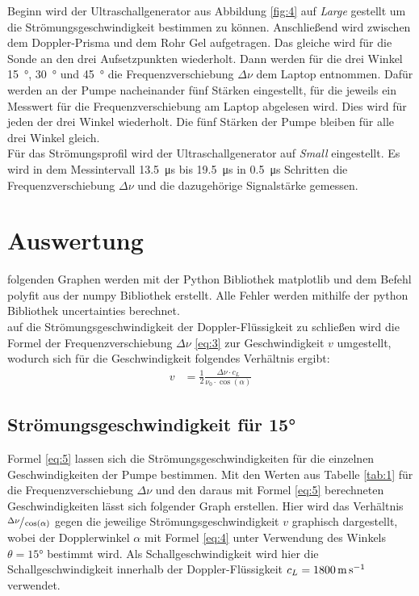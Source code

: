     \justifying Beginn wird der Ultraschallgenerator aus Abbildung \ref{fig:4} auf \textit{Large} gestellt um die Strömungsgeschwindigkeit bestimmen zu können. Anschließend wird zwischen
    dem Doppler-Prisma und dem Rohr Gel aufgetragen. Das gleiche wird für die Sonde an den drei Aufsetzpunkten wiederholt. Dann werden für die drei Winkel \SI{15}{\degree}, 
    \SI{30}{\degree} und \SI{45}{\degree} die Frequenzverschiebung $\Delta\nu$ dem Laptop entnommen. Dafür werden an der Pumpe nacheinander fünf Stärken eingestellt, für die jeweils ein Messwert 
    für die Frequenzverschiebung am Laptop abgelesen wird. Dies wird für jeden der drei Winkel wiederholt. Die fünf Stärken der Pumpe bleiben für alle drei Winkel gleich.\\
    Für das Strömungsprofil wird der Ultraschallgenerator auf \textit{Small} eingestellt. Es wird in dem Messintervall \SI{13.5}{\micro\second} bis \SI{19.5}{\micro\second} in \SI{0.5}{\micro\second} Schritten die 
    Frequenzverschiebung $\Delta\nu$ und die dazugehörige Signalstärke gemessen. 

\newpage
\section{Auswertung}

    \justifying folgenden Graphen werden mit der Python Bibliothek matplotlib \cite{matplotlib} und dem Befehl polyfit aus der numpy Bibliothek \cite{numpy} erstellt. 
    Alle Fehler werden mithilfe der python Bibliothek uncertainties \cite{uncertainties} berechnet.\\
    \justifying auf die Strömungsgeschwindigkeit der Doppler-Flüssigkeit zu schließen wird die Formel der Frequenzverschiebung $\Delta\nu$ \eqref{eq:3} zur Geschwindigkeit
    $v$ umgestellt, wodurch sich für die Geschwindigkeit folgendes Verhältnis ergibt:
    \begin{align}
        v &= \frac{1}{2} \frac{\Delta\nu \cdot c_L}{\nu_0\cdot \cos(\alpha)} \label{eq:5}
    \end{align}

\subsection{Strömungsgeschwindigkeit für 15°}

    \justifying Formel \eqref{eq:5} lassen sich die Strömungsgeschwindigkeiten für die einzelnen Geschwindigkeiten der Pumpe bestimmen. Mit den Werten aus 
    Tabelle \ref{tab:1} für die Frequenzverschiebung $\Delta\nu$ und den daraus mit Formel \eqref{eq:5} berechneten Geschwindigkeiten lässt sich folgender Graph erstellen. Hier
    wird das Verhältnis $\sfrac{\Delta\nu}{\cos(\alpha)}$ gegen die jeweilige Strömungsgeschwindigkeit $v$ graphisch dargestellt, wobei der Dopplerwinkel $\alpha$ mit Formel 
    \eqref{eq:4} unter Verwendung des Winkels $\theta=15°$ bestimmt wird. Als Schallgeschwindigkeit wird hier die Schallgeschwindigkeit innerhalb der Doppler-Flüssigkeit
    $c_L=\text{\SI{1800}{\meter\per\second}}$ verwendet. 

